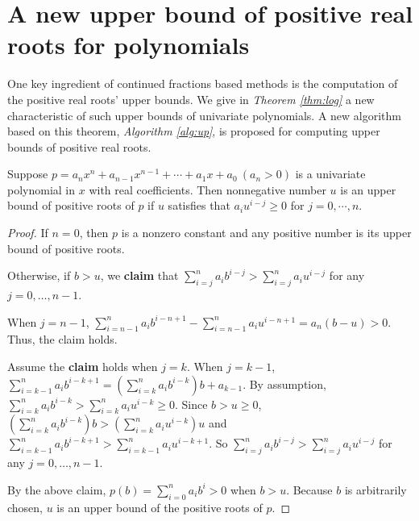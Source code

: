 
\section{A new upper bound of positive real roots for polynomials}
\label{sec:thm}

One key ingredient of continued fractions based methods is the computation of  the positive real roots' upper bounds. We give in {\em Theorem \ref{thm:log}} a new characteristic of such upper bounds of univariate polynomials. A new algorithm based on this theorem, {\em Algorithm \ref{alg:up}}, is proposed for computing upper bounds of positive real roots.


\begin{theorem}
	\label{thm:log}
  Suppose   $p=a_nx^n+a_{n-1}x^{n-1}+\cdots+a_1x+a_0\ (a_n>0)$  is a univariate polynomial in $x$ with real coefficients.  Then  nonnegative number $u$ is an upper bound of positive roots of $p$ if $u$   satisfies that  $a_i u^{i-j}\ge 0$ for $j=0,\cdots, n $.
\end{theorem}
\begin{proof}
  If $n=0$, then $p$ is a nonzero constant and any positive number is its upper bound of positive roots.

  Otherwise, if $b>u$,  we {\bf claim} that $\sum_{i=j}^na_ib^{i-j}> \sum_{i=j}^na_iu^{i-j}$ for any $j= 0,\ldots,n-1$.

  When $j=n-1$, $\sum_{i=n-1}^na_ib^{i-n+1}-\sum_{i=n-1}^na_iu^{i-n+1}=a_n(b-u)>0.$ Thus, the claim holds.

  Assume the {\bf claim} holds  when $j=k$. When $j=k-1$,  $\sum_{i=k-1}^na_ib^{i-k+1}=\left(\sum_{i=k}^na_ib^{i-k}\right)b+a_{k-1} $. By assumption,
  $\sum_{i=k}^na_ib^{i-k}>\sum_{i=k}^na_iu^{i-k}\ge0$. Since $b>u\ge0$, $\left(\sum_{i=k}^na_ib^{i-k}\right)b>\left (\sum_{i=k}^na_iu^{i-k} \right)u  $
  and $\sum_{i=k-1}^na_ib^{i-k+1}> \sum_{i=k-1}^na_iu^{i-k+1}$. So  $\sum_{i=j}^na_ib^{i-j}> \sum_{i=j}^na_iu^{i-j}$ for any $j= 0,\ldots,n-1$.


  By the above claim,   $p(b)=\sum_{i=0}^na_ib^i>0$ when  $b>u$. Because $b$ is arbitrarily chosen, $u$ is an upper bound of the positive roots of $p$.

\end{proof}
